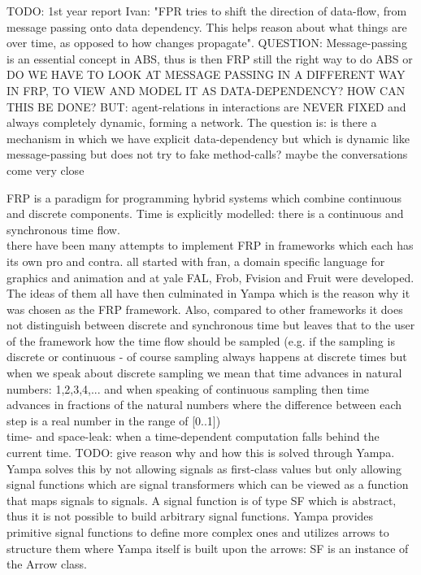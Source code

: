 TODO: 1st year report Ivan: "FPR tries to shift the direction of data-flow, from message passing onto data dependency. This helps reason about what things are over time, as opposed to how changes propagate". QUESTION: Message-passing is an essential concept in ABS, thus is then FRP still the right way to do ABS or DO WE HAVE TO LOOK AT MESSAGE PASSING IN A DIFFERENT WAY IN FRP, TO VIEW AND MODEL IT AS DATA-DEPENDENCY? HOW CAN THIS BE DONE?
BUT: agent-relations in interactions are NEVER FIXED and always completely dynamic, forming a network. The question is: is there a mechanism in which we have explicit data-dependency but which is dynamic like message-passing but does not try to fake method-calls? maybe the conversations come very close


FRP is a paradigm for programming hybrid systems which combine continuous and discrete components. Time is explicitly modelled: there is a continuous and synchronous time flow.  \\

there have been many attempts to implement FRP in frameworks which each has its own pro and contra. all started with fran, a domain specific language for graphics and animation and at yale FAL, Frob, Fvision and Fruit were developed. The ideas of them all have then culminated in Yampa which is the reason why it was chosen as the FRP framework. Also, compared to other frameworks it does not distinguish between discrete and synchronous time but leaves that to the user of the framework how the time flow should be sampled (e.g. if the sampling is discrete or continuous - of course sampling always happens at discrete times but when we speak about discrete sampling we mean that time advances in natural numbers: 1,2,3,4,... and when speaking of continuous sampling then time advances in fractions of the natural numbers where the difference between each step is a real number in the range of [0..1]) \\

time- and space-leak: when a time-dependent computation falls behind the current time. TODO: give reason why and how this is solved through Yampa. \\
Yampa solves this by not allowing signals as first-class values but only allowing signal functions which are signal transformers which can be viewed as a function that maps signals to signals. A signal function is of type SF which is abstract, thus it is not possible to build arbitrary signal functions. Yampa provides primitive signal functions to define more complex ones and utilizes arrows \cite{Hughes2004} to structure them where Yampa itself is built upon the arrows: SF is an instance of the Arrow class. \\

